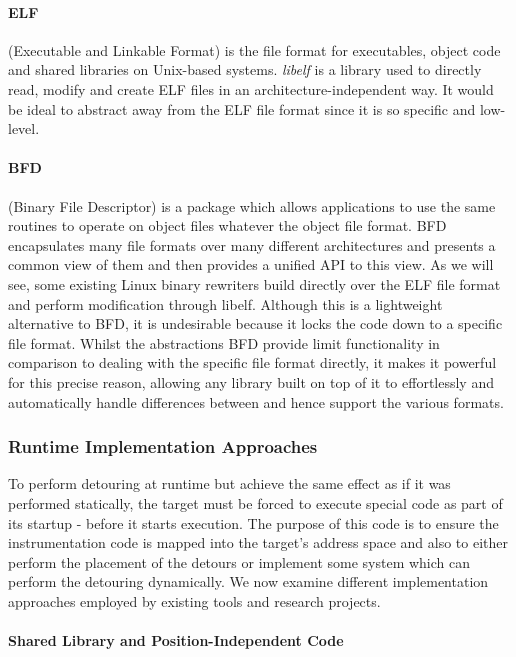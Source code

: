 \paragraph{ELF}

(Executable and Linkable Format) is the file format for executables, object code and shared libraries on Unix-based systems. \emph{libelf} is a library used to directly read, modify and create ELF files in an architecture-independent way. It would be ideal to abstract away from the ELF file format since it is so specific and low-level.

\paragraph{BFD}

(Binary File Descriptor) is a package which allows applications to use the same routines to operate on object files whatever the object file format\cite{bfd}. BFD encapsulates many file formats over many different architectures and presents a common view of them and then provides a unified API to this view. As we will see, some existing Linux binary rewriters build directly over the ELF file format and perform modification through libelf. Although this is a lightweight alternative to BFD, it is undesirable because it locks the code down to a specific file format. Whilst the abstractions BFD provide limit functionality in comparison to dealing with the specific file format directly, it makes it powerful for this precise reason, allowing any library built on top of it to effortlessly and automatically handle differences between and hence support the various formats.

\subsubsection{Runtime Implementation Approaches}

To perform detouring at runtime but achieve the same effect as if it was performed statically, the target must be forced to execute special code as part of its startup - before it starts execution. The purpose of this code is to ensure the instrumentation code is mapped into the target's address space and also to either perform the placement of the detours or implement some system which can perform the detouring dynamically. We now examine different implementation approaches employed by existing tools and research projects.

\paragraph{Shared Library and Position-Independent Code}

